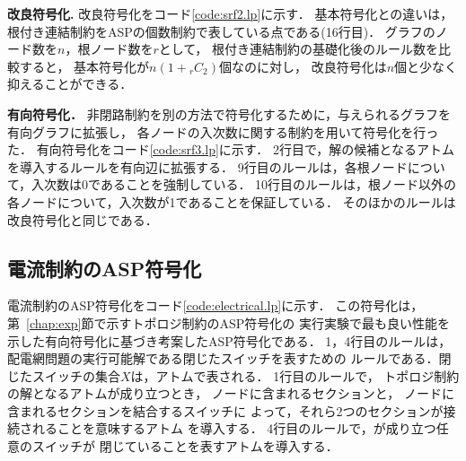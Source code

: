 \textbf{改良符号化.}
%
改良符号化をコード\ref{code:srf2.lp}に示す．
基本符号化との違いは，根付き連結制約をASPの個数制約で表している点である(16行目)．
グラフのノード数を$n$，根ノード数を$r$として，
根付き連結制約の基礎化後のルール数を比較すると，
基本符号化が$n(1+{}_{r}C_{2})$個なのに対し，
改良符号化は$n$個と少なく抑えることができる．
 
\textbf{有向符号化．}
非閉路制約を別の方法で符号化するために，与えられるグラフを有向グラフに拡張し，
各ノードの入次数に関する制約を用いて符号化を行った．
有向符号化をコード\ref{code:srf3.lp}に示す．
2行目で，解の候補となるアトムを導入するルールを有向辺に拡張する．
9行目のルールは，各根ノードについて，入次数は0であることを強制している．
10行目のルールは，根ノード以外の各ノードについて，入次数が1であることを保証している．
そのほかのルールは改良符号化と同じである．

\subsection{電流制約のASP符号化}\label{chap:electrical}



電流制約のASP符号化をコード\ref{code:electrical.lp}に示す．
この符号化は，第~\ref{chap:exp}節で示すトポロジ制約のASP符号化の
実行実験で最も良い性能を示した有向符号化に基づき考案したASP符号化である．
%
1，4行目のルールは，配電網問題の実行可能解である閉じたスイッチを表すための
ルールである．閉じたスイッチの集合$X$は，アトムで表される．
1行目のルールで，
トポロジ制約の解となるアトムが成り立つとき，
ノードに含まれるセクションと，
ノードに含まれるセクションを結合するスイッチに
よって，それら2つのセクションが接続されることを意味するアトム
を導入する．
4行目のルールで，が成り立つ任意のスイッチが
閉じていることを表すアトムを導入する．

